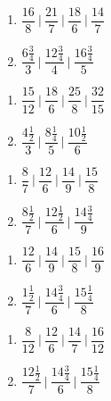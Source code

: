 
\begin{multicols}{2}
\begin{enumerate}[$(1)$]
\item $\dfrac{16}{8}~\bigg|~ \dfrac{21}{7} ~\bigg|~ \dfrac{18}{6}~\bigg|~ 
\dfrac{14}{7}$ 
\item $ \dfrac{6\frac{3}{4}}{3}~\bigg|~ \dfrac{12\frac{3}{4}}{4} ~\bigg|~\dfrac{16\frac{3}{4}}{5}$ 
\end{enumerate}
\end{multicols}


\begin{multicols}{2}
\begin{enumerate}[$(1)$]
\item $\dfrac{15}{12}~\bigg|~ \dfrac{18}{6} ~\bigg|~ \dfrac{25}{8}~\bigg|~ 
\dfrac{32}{15}$ 
\item $ \dfrac{4\frac{1}{2}}{3}~\bigg|~ \dfrac{8\frac{1}{4}}{5} ~\bigg|~\dfrac{10\frac{1}{2}}{6}$ 
\end{enumerate}
\end{multicols}


\begin{multicols}{2}
\begin{enumerate}[$(1)$]
\item $\dfrac{8}{7}~\bigg|~ \dfrac{12}{6} ~\bigg|~ \dfrac{14}{9}~\bigg|~ 
\dfrac{15}{8}$ 
\item $ \dfrac{8\frac{1}{2}}{7}~\bigg|~ \dfrac{12\frac{1}{2}}{6} ~\bigg|~\dfrac{14\frac{3}{4}}{9}$ 
\end{enumerate}
\end{multicols}


\begin{multicols}{2}
\begin{enumerate}[$(1)$]
\item $\dfrac{12}{6}~\bigg|~ \dfrac{14}{9} ~\bigg|~ \dfrac{15}{8}~\bigg|~ 
\dfrac{16}{9}$ 
\item $ \dfrac{1\frac{1}{2}}{7}~\bigg|~ \dfrac{14\frac{3}{4}}{6} ~\bigg|~\dfrac{15\frac{1}{4}}{8}$ 
\end{enumerate}
\end{multicols}


\begin{multicols}{2}
\begin{enumerate}[$(1)$]
\item $\dfrac{8}{12}~\bigg|~ \dfrac{12}{6} ~\bigg|~ \dfrac{14}{7}~\bigg|~ 
\dfrac{16}{12}$ 
\item $ \dfrac{12\frac{1}{2}}{7}~\bigg|~ \dfrac{14\frac{3}{4}}{6} ~\bigg|~\dfrac{15\frac{1}{4}}{8}$ 
\end{enumerate}
\end{multicols}

